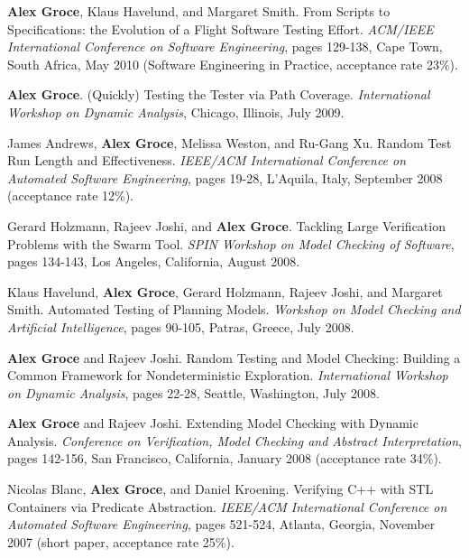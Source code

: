 \documentclass[ComputerScience]{vita}
\begin{document}
\begin{vita}
\begin{Refereed Conference and Workshop Publications}
\item
{\bf Alex Groce}, Klaus Havelund, and Margaret Smith.
\newblock From Scripts to Specifications: the Evolution of a Flight Software Testing Effort.
\newblock \emph{ACM/IEEE International Conference on Software Engineering}, pages 129-138, Cape Town, South Africa, May 2010 (Software Engineering in Practice, acceptance rate 23\%). 

\item
{\bf Alex Groce}.
\newblock (Quickly) Testing the Tester via Path Coverage.
\newblock \emph{International Workshop on Dynamic Analysis}, Chicago, Illinois, July 2009.

\item
James Andrews, {\bf Alex Groce}, Melissa Weston, and Ru-Gang Xu.
\newblock Random Test Run Length and Effectiveness.
\newblock \emph{IEEE/ACM International Conference on Automated Software Engineering}, pages 19-28, L'Aquila, Italy, September 2008 (acceptance rate 12\%).

\item
Gerard Holzmann, Rajeev Joshi, and {\bf Alex Groce}.
\newblock Tackling Large Verification Problems with the Swarm Tool.
\newblock \emph{SPIN Workshop on Model Checking of Software}, pages 134-143, Los Angeles, California, August 2008.

\item
Klaus Havelund, {\bf Alex Groce}, Gerard Holzmann, Rajeev Joshi, and Margaret Smith.
\newblock Automated Testing of Planning Models.
\newblock \emph{Workshop on Model Checking and Artificial Intelligence}, pages 90-105, Patras, Greece, July 2008.

\item
{\bf Alex Groce} and Rajeev Joshi.
\newblock Random Testing and Model Checking:   Building a Common Framework for Nondeterministic Exploration.
\newblock \emph{International Workshop on Dynamic Analysis}, pages 22-28, Seattle, Washington, July 2008.

\item
{\bf Alex Groce} and Rajeev Joshi.
\newblock Extending Model Checking with Dynamic Analysis.
\newblock \emph{Conference on Verification, Model Checking and Abstract Interpretation}, pages 142-156, San Francisco, California, January 2008 (acceptance rate 34\%).

\item
Nicolas Blanc, {\bf Alex Groce}, and Daniel Kroening.
\newblock Verifying C++ with STL Containers via Predicate Abstraction.
\newblock \emph{IEEE/ACM International Conference on Automated Software Engineering}, pages 521-524, Atlanta, Georgia, November 2007 (short paper, acceptance rate 25\%).


\end{Refereed Conference and Workshop Publications}
\end{vita}
\end{document}
